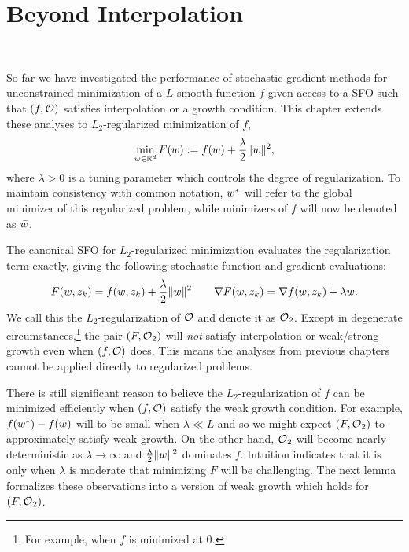 
\chapter{Beyond Interpolation}~\label{ch:beyond-interpolation}

So far we have investigated the performance of stochastic gradient methods for unconstrained minimization of a \( L \)-smooth function \( f \) given access to a SFO \oracle{} such that \( \rbr{f, \oracle{}} \) satisfies interpolation or a growth condition. 
This chapter extends these analyses to \( L_2 \)-regularized minimization of \( f \), 
\begin{align}
    \min_{\w \in \R^d} F(\w) := f(\w) + \frac{\lambda}{2} \norm{\w}^2,\label{eq:l2-reguarlized-problem}
\end{align}
where \( \lambda > 0 \) is a tuning parameter which controls the degree of regularization. 
To maintain consistency with common notation, \( \wopt \) will refer to the global minimizer of this regularized problem, while minimizers of \( f \) will now be denoted as \( \wbar \).

The canonical SFO for \( L_2 \)-regularized minimization evaluates the regularization term exactly, giving the following stochastic function and gradient evaluations: 
\[ F(\w, \zk) = f(\w, \zk) + \frac{\lambda}{2} \norm{\w}^2 \quad \quad \nabla F(\w, \zk) = \grad(\w, \zk) + \lambda \w.  \]
We call this the \( L_2 \)-regularization of \( \oracle{} \) and denote it as \( \oracle{}_2 \).
Except in degenerate circumstances,\footnote{For example, when \( f \) is minimized at \( 0 \).} the pair \( \rbr{F, \oracle{}_2} \) will \emph{not} satisfy interpolation or weak/strong growth even when \( \rbr{f, \oracle{}} \) does. 
This means the analyses from previous chapters cannot be applied directly to regularized problems.

There is still significant reason to believe the \( L_2 \)-regularization of \( f \) can be minimized efficiently when \( \rbr{f, \oracle{}} \) satisfy the weak growth condition.
For example, \( f(\wopt) - f(\wbar) \) will to be small when \( \lambda \ll L \) and so we might expect \( \rbr{F, \oracle{}_2} \) to approximately satisfy weak growth. 
On the other hand, \( \oracle{}_2 \) will become nearly deterministic as \( \lambda \rightarrow \infty \) and \( \frac{\lambda}{2} \norm{\w}^2 \) dominates \( f \).
Intuition indicates that it is only when \( \lambda \) is moderate that minimizing \( F \) will be challenging.
The next lemma formalizes these observations into a version of weak growth which holds for \( \rbr{F, \oracle{}_2} \).

